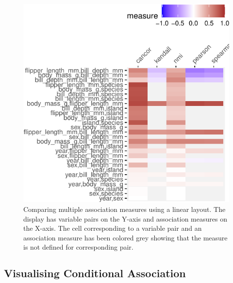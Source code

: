 \begin{Schunk}
\begin{figure}

{\centering \includegraphics{rj_paper_files/figure-latex/compare-linear-1} 

}

\caption[Comparing multiple association measures using a linear layout]{Comparing multiple association measures using a linear layout. The display has variable pairs on the Y-axis and association measures on the X-axis. The cell corresponding to a variable pair and an association measure has been colored grey showing that the measure is not defined for corresponding pair.}\label{fig:compare-linear}
\end{figure}
\end{Schunk}

\hypertarget{visualising-conditional-association}{%
\subsection{Visualising Conditional
Association}\label{visualising-conditional-association}}

